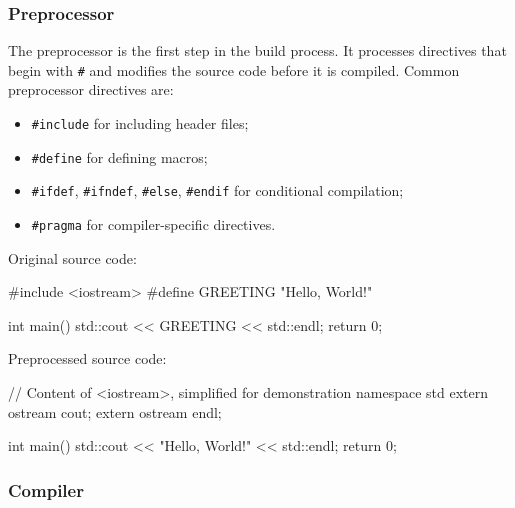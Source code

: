 \subsubsection{Preprocessor}

    The preprocessor is the first step in the build process. It processes directives that begin with \texttt{\#} and modifies the source code before it is compiled.
    Common preprocessor directives are:

    \vspace{0.5em}
    
    \begin{itemize}
        \item \texttt{\#include} for including header files;
        \item \texttt{\#define} for defining macros;
        \item \texttt{\#ifdef}, \texttt{\#ifndef}, \texttt{\#else}, \texttt{\#endif} for conditional compilation;
        \item \texttt{\#pragma} for compiler-specific directives.
    \end{itemize}

    \begin{exampleblock}[Preprocessor]
        Original source code:
        
        \begin{codeblock}[language=C++]
#include <iostream>
#define GREETING "Hello, World!"

int main() {
    std::cout << GREETING << std::endl;
    return 0;
}
        \end{codeblock}
        
        Preprocessed source code:
        
        \begin{codeblock}[language=C++]
// Content of <iostream>, simplified for demonstration
namespace std {
    extern ostream cout; 
    extern ostream endl;
}

int main() {
    std::cout << "Hello, World!" << std::endl;
    return 0;
}
        \end{codeblock}
    \end{exampleblock}    

\subsubsection{Compiler}
    
